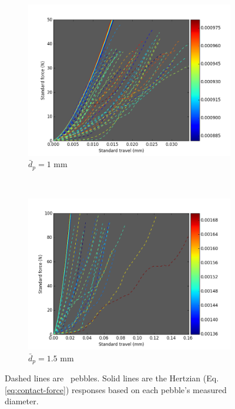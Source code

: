 \begin{figure}
        \centering
        \begin{subfigure}[b]{\doubleimagewidth}
                \includegraphics[width=\textwidth]{chapters/figures/nfri-1mm-data-w-ideal-hertz.png}
                \caption{$\bar{d}_p = 1$ mm}
                \label{fig:nfri-1-exp-colormap}
        \end{subfigure}
        ~
        \begin{subfigure}[b]{\doubleimagewidth}
                \includegraphics[width=\textwidth]{chapters/figures/nfri-1.5mm-data-w-ideal-hertz.png}
                \caption{$\bar{d}_p = 1.5$ mm}
                \label{fig:nfri-1.5-exp-colormap}
        \end{subfigure}
        \caption{Dashed lines are \lit~pebbles. Solid lines are the Hertzian (Eq.\ref{eq:contact-force}) responses based on each pebble's measured diameter.}\label{fig:nfri-exp-curves}
\end{figure}


